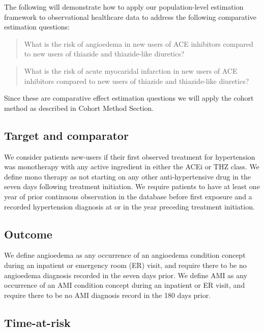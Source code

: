 \documentclass[]{book}
\begin{document}
The following will demonstrate how to apply our population-level estimation framework to observational healthcare data to address the following comparative estimation questions:

\begin{quote}
What is the risk of angioedema in new users of ACE inhibitors compared to new users of thiazide and thiazide-like diuretics?
\end{quote}

\begin{quote}
What is the risk of acute myocaridal infarction in new users of ACE inhibitors compared to new users of thiazide and thiazide-like diuretics?
\end{quote}

Since these are comparative effect estimation questions we will apply the cohort method as described in Cohort Method Section.

\hypertarget{target-and-comparator}{%
\subsection{Target and comparator}\label{target-and-comparator}}

We consider patients new-users if their first observed treatment for hypertension was monotherapy with any active ingredient in either the ACEi or THZ class. We define mono therapy as not starting on any other anti-hypertensive drug in the seven days following treatment initiation. We require patients to have at least one year of prior continuous observation in the database before first exposure and a recorded hypertension diagnosis at or in the year preceding treatment initiation.

\hypertarget{outcome}{%
\subsection{Outcome}\label{outcome}}

We define angioedema as any occurrence of an angioedema condition concept during an inpatient or emergency room (ER) visit, and require there to be no angioedema diagnosis recorded in the seven days prior. We define AMI as any occurrence of an AMI condition concept during an inpatient or ER visit, and require there to be no AMI diagnosis record in the 180 days prior.

\hypertarget{time-at-risk}{%
\subsection{Time-at-risk}\label{time-at-risk}}
\end{document}
